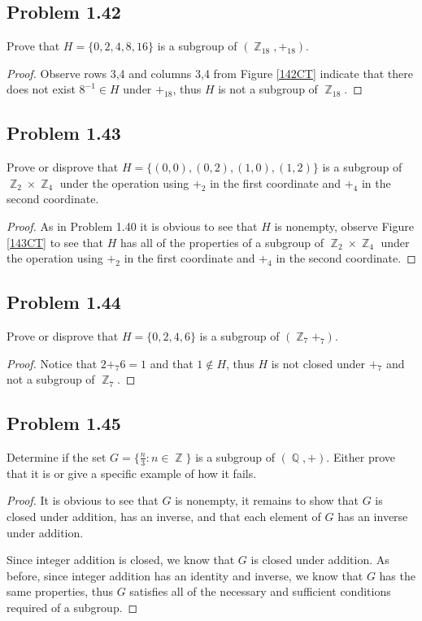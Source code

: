 \documentclass{amsbook}
\DeclareMathOperator{\Z}{\mathbb{Z}}
\DeclareMathOperator{\Q}{\mathbb{Q}}
\begin{document}
			\subsection*{Problem 1.42}
			\label{sub:problem_1_42}
			Prove that $H = \{ 0,2, 4, 8, 16 \}$ is a subgroup of $(\Z_{18}, +_{18})$.
			\begin{proof} Observe rows 3,4 and columns 3,4 from Figure \ref{142CT} indicate that there does not exist $8^{-1} \in H$ under $+_{18}$, thus $H$ is not a subgroup of $\Z_{18}$.
			\end{proof}

			\subsection*{Problem 1.43}
			\label{sub:problem_1_43}
			Prove or disprove that $H = \{(0, 0), (0, 2), (1, 0), (1,2) \}$ is a subgroup of $\Z_{2} \times \Z_{4}$ under the operation using $+_{2}$ in the first coordinate and $+_{4}$ in the second coordinate.
			\begin{proof} As in Problem 1.40 it is obvious to see that $H$ is nonempty, observe Figure \ref{143CT} to see that $H$ has all of the properties of a subgroup of $\Z_{2} \times \Z_{4}$ under the operation using $+_{2}$ in the first coordinate and $+_{4}$ in the second coordinate.
			\end{proof}

			\subsection*{Problem 1.44}
			\label{sub:problem_1_44}
			Prove or disprove that $H = \{ 0,2, 4, 6 \}$ is a subgroup of $(\Z_{7} +_{7})$.
			\begin{proof} Notice that $2 +_{7} 6 = 1$ and that $1 \notin H$, thus $H$ is not closed under $+_{7}$ and not a subgroup of $\Z_{7}$.
			\end{proof}

			\subsection*{Problem 1.45}
			\label{sub:problem_1_45}
			Determine if the set $G = \{ \frac{n}{3} : n \in \Z \}$ is a subgroup of $(\Q,+)$. 
			Either prove that it is or give a specific example of how it fails.
			\begin{proof} It is obvious to see that $G$ is nonempty, it remains to show that $G$ is closed under addition, has an inverse, and that each element of $G$ has an inverse under addition.

			Since integer addition is closed, we know that $G$ is closed under addition.
			As before, since integer addition has an identity and inverse, we know that $G$ has the same properties, thus $G$ satisfies all of the necessary and sufficient conditions required of a subgroup.
			\end{proof}
\end{document}
